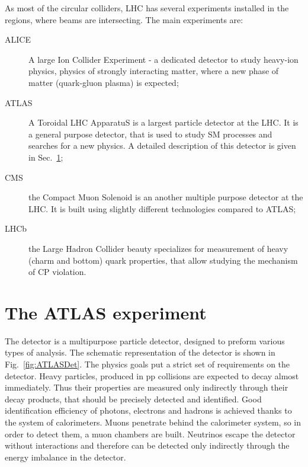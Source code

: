 As most of the circular colliders, LHC has several experiments installed in the regions, where beams are intersecting. The main experiments are:
\begin{description}
\item [ALICE] A large Ion Collider Experiment\cite{ALICE} - a dedicated detector to study heavy-ion physics, physics of strongly interacting matter, where a new phase of matter (quark-gluon plasma) is expected;
\item [ATLAS] A Toroidal LHC ApparatuS\cite{ATLASDetectorPlot} is a largest particle detector at the LHC. It is a general purpose detector, that is used to study SM processes and searches for a new physics. A detailed description of this detector is given in Sec.~\ref{sec:ATLAS};
\item [CMS] the Compact Muon Solenoid\cite{CMS} is an another multiple purpose detector at the LHC. It is built using slightly different technologies compared to ATLAS;
\item [LHCb] the Large Hadron Collider beauty \cite{LHCb} specializes for measurement of heavy (charm and bottom) quark properties, that allow studying the mechanism of CP violation.
\end{description}


\begin{figure}[!tb]
\end{figure}

\section{The ATLAS experiment} \label{sec:ATLAS}

\begin{figure}[!tbp]
\end{figure}
The \atlas detector is a multipurpose particle detector, designed to preform various types of analysis. The schematic representation of the \atlas detector is shown in Fig.~\ref{fig:ATLASDet}. The physics goals put a strict set of requirements on the \atlas detector. Heavy particles, produced in pp collisions are expected to decay almost immediately. Thus their properties are measured only indirectly through their decay products, that should be precisely detected and identified. Good identification efficiency of photons, electrons and hadrons is achieved thanks to the system of calorimeters. Muons penetrate behind the calorimeter system, so in order to detect them, a muon chambers are built. Neutrinos escape the detector without interactions and therefore can be detected only indirectly through the energy imbalance in the detector.

